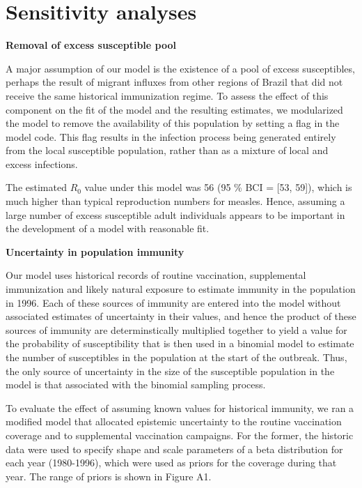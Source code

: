 \appendix

\section{Sensitivity analyses}

\textbf{Removal of excess susceptible pool}

A major assumption of our model is the existence of a pool of excess susceptibles, perhaps the result of migrant influxes from other regions of Brazil that did not receive the same historical immunization regime. To assess the effect of this component on the fit of the model and the resulting estimates, we modularized the model to remove the availability of this population by setting a flag in the model code. This flag results in the infection process being generated entirely from the local susceptible population, rather than as a mixture of local and excess infections.

The estimated $R_0$ value under this model was 56 (95 \% BCI = [53, 59]), which is much higher than typical reproduction numbers for measles. Hence, assuming a large number of excess susceptible adult individuals appears to be important in the development of a model with reasonable fit.

\textbf{Uncertainty in population immunity}

Our model uses historical records of routine vaccination, supplemental immunization and likely natural exposure to estimate immunity in the population in 1996. Each of these sources of immunity are entered into the model without associated estimates of uncertainty in their values, and hence the product of these sources of immunity are determinstically multiplied together to yield a value for the probability of susceptibility that is then used in a binomial model to estimate the number of susceptibles in the population at the start of the outbreak. Thus, the only source of uncertainty in the size of the susceptible population in the model is that associated with the binomial sampling process.

To evaluate the effect of assuming known values for historical immunity, we ran a modified model that allocated epistemic uncertainty to the routine vaccination coverage and to supplemental vaccination campaigns. For the former, the historic data were used to specify shape and scale parameters of a beta distribution for each year (1980-1996), which were used as priors for the coverage during that year. The range of priors is shown in Figure A1.